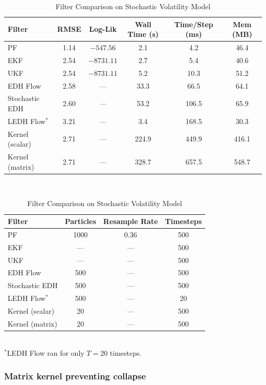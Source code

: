 \documentclass{article}
\begin{document}
\begin{table}[H]
\centering
\caption{Filter Comparison on Stochastic Volatility Model}
\begin{tabular}{lccccc}
\toprule
\textbf{Filter} & \textbf{RMSE} & \textbf{Log-Lik} & \textbf{Wall Time (s)} & \textbf{Time/Step (ms)} & \textbf{Mem (MB)} \\
\midrule
PF              & 1.14  & $-547.56$   & 2.1    & 4.2     & 46.4   \\
EKF             & 2.54  & $-8731.11$  & 2.7    & 5.4     & 40.6   \\
UKF             & 2.54  & $-8731.11$  & 5.2    & 10.3    & 51.2   \\
EDH Flow        & 2.58  & ---         & 33.3   & 66.5    & 64.1   \\
Stochastic EDH  & 2.60  & ---         & 53.2   & 106.5   & 65.9   \\
LEDH Flow$^*$   & 3.21  & ---         & 3.4    & 168.5   & 30.3   \\
Kernel (scalar) & 2.71  & ---         & 224.9  & 449.9   & 416.1  \\
Kernel (matrix) & 2.71  & ---         & 328.7  & 657.5   & 548.7  \\
\bottomrule
\end{tabular}
\\[1em]
\begin{tabular}{lccc}
\toprule
\textbf{Filter} & \textbf{Particles} & \textbf{Resample Rate} & \textbf{Timesteps} \\
\midrule
PF              & 1000 & 0.36 & 500 \\
EKF             & ---  & ---  & 500 \\
UKF             & ---  & ---  & 500 \\
EDH Flow        & 500  & ---  & 500 \\
Stochastic EDH  & 500  & ---  & 500 \\
LEDH Flow$^*$   & 500  & ---  & 20  \\
Kernel (scalar) & 20   & ---  & 500 \\
Kernel (matrix) & 20   & ---  & 500 \\
\bottomrule
\end{tabular}
\\[0.5em]
{\small $^*$LEDH Flow ran for only $T=20$ timesteps.}
\label{tab:sv_comparison}
\end{table}

\subsubsection{Matrix kernel preventing collapse}
\end{document}
